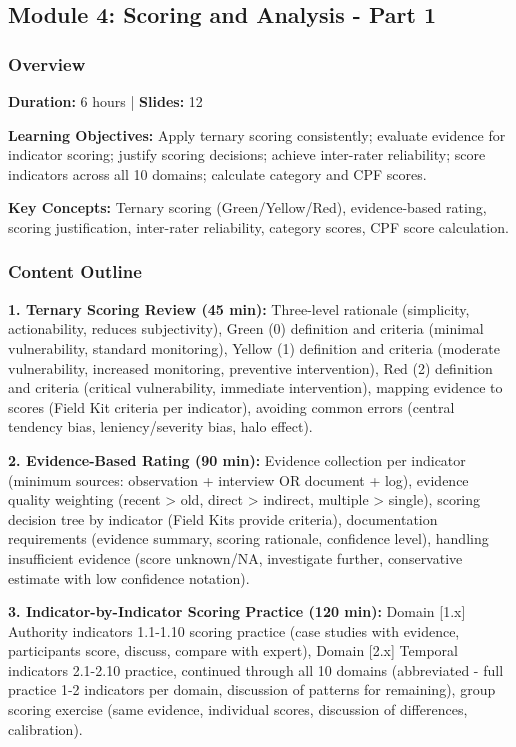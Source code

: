 \documentclass[11pt,a4paper]{article}
\begin{document}
\subsection{Module 4: Scoring and Analysis - Part 1}

\subsubsection{Overview}
\textbf{Duration:} 6 hours | \textbf{Slides:} 12

\textbf{Learning Objectives:} Apply ternary scoring consistently; evaluate evidence for indicator scoring; justify scoring decisions; achieve inter-rater reliability; score indicators across all 10 domains; calculate category and CPF scores.

\textbf{Key Concepts:} Ternary scoring (Green/Yellow/Red), evidence-based rating, scoring justification, inter-rater reliability, category scores, CPF score calculation.

\subsubsection{Content Outline}

\textbf{1. Ternary Scoring Review (45 min):} Three-level rationale (simplicity, actionability, reduces subjectivity), Green (0) definition and criteria (minimal vulnerability, standard monitoring), Yellow (1) definition and criteria (moderate vulnerability, increased monitoring, preventive intervention), Red (2) definition and criteria (critical vulnerability, immediate intervention), mapping evidence to scores (Field Kit criteria per indicator), avoiding common errors (central tendency bias, leniency/severity bias, halo effect).

\textbf{2. Evidence-Based Rating (90 min):} Evidence collection per indicator (minimum sources: observation + interview OR document + log), evidence quality weighting (recent > old, direct > indirect, multiple > single), scoring decision tree by indicator (Field Kits provide criteria), documentation requirements (evidence summary, scoring rationale, confidence level), handling insufficient evidence (score unknown/NA, investigate further, conservative estimate with low confidence notation).

\textbf{3. Indicator-by-Indicator Scoring Practice (120 min):} Domain [1.x] Authority indicators 1.1-1.10 scoring practice (case studies with evidence, participants score, discuss, compare with expert), Domain [2.x] Temporal indicators 2.1-2.10 practice, continued through all 10 domains (abbreviated - full practice 1-2 indicators per domain, discussion of patterns for remaining), group scoring exercise (same evidence, individual scores, discussion of differences, calibration).
\end{document}
